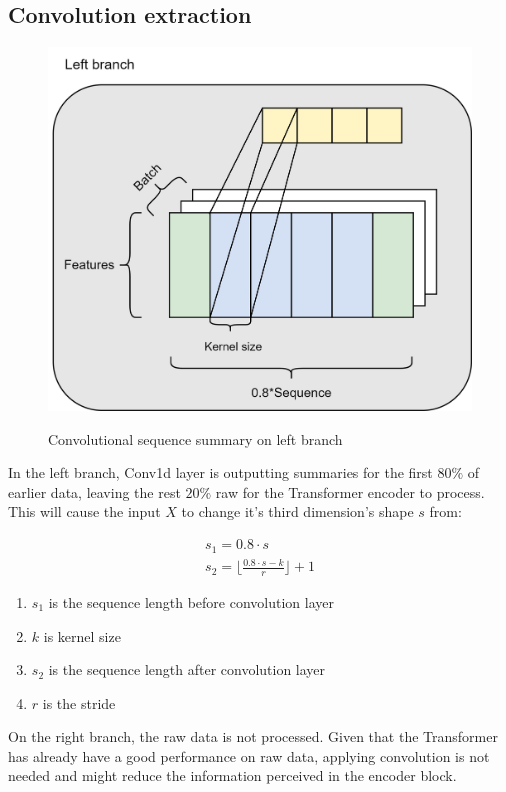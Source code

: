 \documentclass[stu,12pt,floatsintext]{apa7}
\begin{document}
\subsection{Convolution extraction}

\begin{figure}[H]
    \caption{Convolutional sequence summary on left branch}
    \centering
    \includegraphics[width=0.7\linewidth]{images/Left branch.png}
    \label{fig:convolutional-operation}
\end{figure}

In the left branch, Conv1d layer is outputting summaries for the first $80\%$ of earlier data, leaving the rest $20\%$ raw for the Transformer encoder to process. This will cause the input $X$ to change it's third dimension's shape $s$ from:

\begin{gather}
    s_1=0.8\cdot s\\
    s_2=\lfloor\frac{0.8\cdot s-k}{r} \rfloor+1
\end{gather}

\begin{enumerate}
    \item $s_1$ is the sequence length before convolution layer
    \item $k$ is kernel size
    \item $s_2$ is the sequence length after convolution layer
    \item $r$ is the stride
\end{enumerate}

On the right branch, the raw data is not processed. Given that the Transformer has already have a good performance on raw data, applying convolution is not needed and might reduce the information perceived in the encoder block. 
\end{document}
